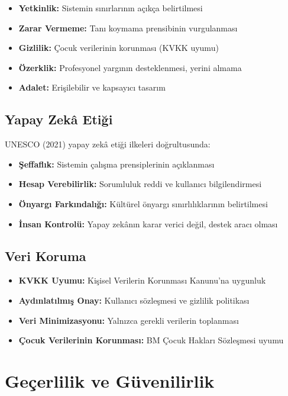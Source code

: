 \begin{itemize}
  \item \textbf{Yetkinlik:} Sistemin sınırlarının açıkça belirtilmesi
  \item \textbf{Zarar Vermeme:} Tanı koymama prensibinin vurgulanması
  \item \textbf{Gizlilik:} Çocuk verilerinin korunması (KVKK uyumu)
  \item \textbf{Özerklik:} Profesyonel yargının desteklenmesi, yerini almama
  \item \textbf{Adalet:} Erişilebilir ve kapsayıcı tasarım
\end{itemize}

\subsection{Yapay Zekâ Etiği}

UNESCO (2021) yapay zekâ etiği ilkeleri doğrultusunda:

\begin{itemize}
  \item \textbf{Şeffaflık:} Sistemin çalışma prensiplerinin açıklanması
  \item \textbf{Hesap Verebilirlik:} Sorumluluk reddi ve kullanıcı bilgilendirmesi
  \item \textbf{Önyargı Farkındalığı:} Kültürel önyargı sınırlılıklarının belirtilmesi
  \item \textbf{İnsan Kontrolü:} Yapay zekânın karar verici değil, destek aracı olması
\end{itemize}

\subsection{Veri Koruma}

\begin{itemize}
  \item \textbf{KVKK Uyumu:} Kişisel Verilerin Korunması Kanunu'na uygunluk
  \item \textbf{Aydınlatılmış Onay:} Kullanıcı sözleşmesi ve gizlilik politikası
  \item \textbf{Veri Minimizasyonu:} Yalnızca gerekli verilerin toplanması
  \item \textbf{Çocuk Verilerinin Korunması:} BM Çocuk Hakları Sözleşmesi uyumu
\end{itemize}

\section{Geçerlilik ve Güvenilirlik}

